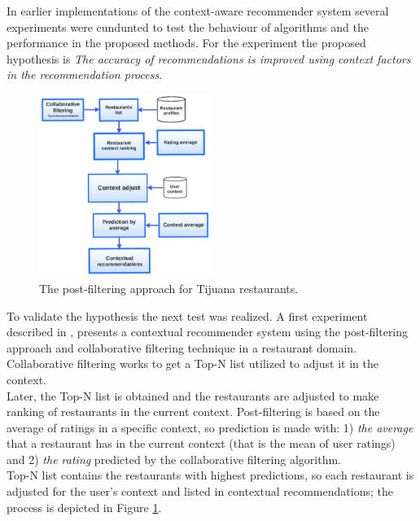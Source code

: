 In earlier implementations of the context-aware recommender system  
several experiments were cundunted to test the behaviour of algorithms 
and the performance in the proposed methods. 
For the experiment the proposed hypothesis is \textit{The accuracy of 
recommendations is improved using context factors in the 
recommendation process}. 
\begin{figure}
\centering
\captionsetup{font=footnotesize}
\setlength\fboxsep{0pt}
\includegraphics[width=0.50\textwidth]{img/posfil.png}
\caption{The post-filtering approach for Tijuana restaurants.}
\label{fig:postfiltering}     
\end{figure}
To validate the hypothesis the next test was realized.
A first experiment described in  \cite{ramirez2013restaurant}, presents a  
contextual recommender system using the post-filtering approach and 
collaborative filtering technique in a restaurant domain. 
Collaborative filtering works to get a Top-N list utilized to adjust it in 
the context. \\
Later, the Top-N list is obtained and the restaurants are adjusted to 
make ranking of restaurants  in the current context. Post-filtering is
based on the average  of ratings in a specific context, so prediction
is made with: 1) \textit{the average} that a restaurant has in the
current context (that is the  mean of user ratings) and 2)  
 \textit{the rating} predicted by the collaborative filtering algorithm.\\ 
Top-N list contains the restaurants with highest predictions, 
so each restaurant is adjusted for the user's context and listed in 
contextual recommendations; the process is depicted in 
Figure  \ref{fig:postfiltering}.
